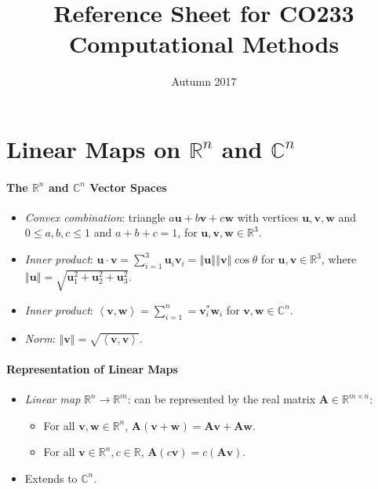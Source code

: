 \documentclass[twocolumn,english]{article}
\begin{document}
\title{Reference Sheet for CO233 Computational Methods}

\date{Autumn 2017}
\maketitle

\section{Linear Maps on $\mathbb{R}^{n}$ and $\mathbb{C}^{n}$}

\paragraph{The $\mathbb{R}^{n}$ and $\mathbb{C}^{n}$ Vector Spaces}
\begin{itemize}
\item \emph{Convex combination}: triangle $a\boldsymbol{u}+b\boldsymbol{v}+c\boldsymbol{w}$
with vertices $\boldsymbol{u},\boldsymbol{v},\boldsymbol{w}$ and
$0\leq a,b,c\leq1$ and $a+b+c=1$, for $\boldsymbol{u},\boldsymbol{v},\boldsymbol{w}\in\mathbb{R}^{3}$.
\item \emph{Inner product}: $\boldsymbol{u}\cdot\boldsymbol{v}=\sum_{i=1}^{3}\boldsymbol{u}_{i}\boldsymbol{v}_{i}=\left\Vert \boldsymbol{u}\right\Vert \left\Vert \boldsymbol{v}\right\Vert \cos\theta$
for $\boldsymbol{u},\boldsymbol{v}\in\mathbb{R}^{3}$, where $\left\Vert \boldsymbol{u}\right\Vert =\sqrt{\boldsymbol{u}_{1}^{2}+\boldsymbol{u}_{2}^{2}+\boldsymbol{u}_{3}^{2}}$.
\item \emph{Inner product}: $\left\langle \boldsymbol{v},\boldsymbol{w}\right\rangle =\sum_{i=1}^{n}=\boldsymbol{v}_{i}^{*}\boldsymbol{w}_{i}$
for $\boldsymbol{v},\boldsymbol{w}\in\mathbb{\mathbb{C}}^{n}$.
\item \emph{Norm}: $\left\Vert \boldsymbol{v}\right\Vert =\sqrt{\left\langle \boldsymbol{v},\boldsymbol{v}\right\rangle }$.
\end{itemize}

\paragraph{Representation of Linear Maps}
\begin{itemize}
\item \emph{Linear map} $\mathbb{R}^{n}\rightarrow\mathbb{R}^{m}$: can
be represented by the real matrix $\boldsymbol{A}\in\mathbb{R}^{m\times n}$:
\begin{itemize}
\item For all $\boldsymbol{v},\boldsymbol{w}\in\mathbb{R}^{n}$, $\boldsymbol{A}(\boldsymbol{v}+\boldsymbol{w})=\boldsymbol{Av}+\boldsymbol{Aw}$.
\item For all $\boldsymbol{v}\in\mathbb{R}^{n},c\in\mathbb{R}$, $\boldsymbol{A}(c\boldsymbol{v})=c\left(\boldsymbol{Av}\right)$.
\end{itemize}
\item Extends to $\mathbb{C}^{n}$.
\end{itemize}
\end{document}
